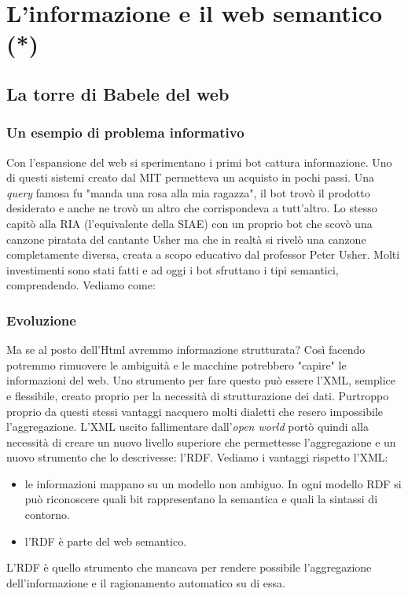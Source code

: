 
\chapter{L'informazione e il web semantico (*)}

	\section{La torre di Babele del web}
	
		\subsection{Un esempio di problema informativo}
			Con l'espansione del web si sperimentano i primi bot cattura informazione. Uno di questi sistemi creato dal MIT permetteva un acquisto in pochi passi. Una \emph{query} famosa fu "manda una rosa alla mia ragazza", il bot trovò il prodotto desiderato e anche ne trovò un altro che corrispondeva a tutt'altro.
			Lo stesso capitò alla RIA (l'equivalente della SIAE) con un proprio bot che scovò una canzone piratata del cantante Usher ma che in realtà si rivelò una canzone completamente diversa, creata a scopo educativo dal professor Peter Usher.
			Molti investimenti sono stati fatti e ad oggi i bot sfruttano i tipi semantici, comprendendo. Vediamo come:
		
		\subsection{Evoluzione}
			Ma se al posto dell'Html avremmo informazione strutturata? Così facendo potremmo rimuovere le  ambiguità e le macchine potrebbero "capire" le informazioni del web. Uno strumento per fare questo può essere l'XML, semplice e flessibile, creato proprio per la necessità di strutturazione dei dati. Purtroppo proprio da questi stessi vantaggi nacquero molti dialetti che resero impossibile l'aggregazione. L'XML uscito fallimentare dall'\emph{open world} portò quindi alla necessità di creare un nuovo livello superiore che permettesse l'aggregazione e un nuovo strumento che lo descrivesse: l'RDF. Vediamo i vantaggi rispetto l'XML:
			\begin{itemize}
				\item le informazioni mappano su un modello non ambiguo. In ogni modello RDF si può riconoscere quali bit rappresentano la semantica e quali la sintassi di contorno.
				\item l'RDF è parte del web semantico.
			\end{itemize}
			L'RDF è quello strumento che mancava per rendere possibile l'aggregazione dell'informazione e il ragionamento automatico su di essa.
		
